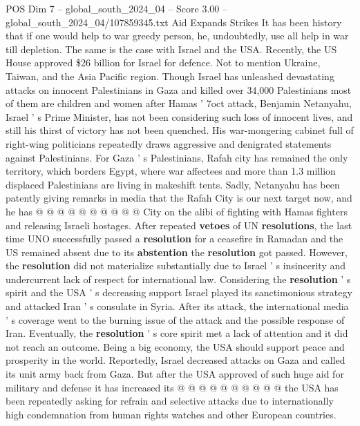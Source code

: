 \begin{textsample}{POS Dim 7 – global\_south\_2024\_04 – Score 3.00 – global\_south\_2024\_04/107859345.txt}  \label{ex:f7_pos_102}
Aid Expands Strikes It has been history that if one would help to war greedy person, he, undoubtedly, use all help in war till depletion.
The same is the case with Israel and the USA.
Recently, the US House approved \$26 billion for Israel for defence.
Not to mention Ukraine, Taiwan, and the Asia Pacific region.
Though Israel has unleashed devastating attacks on innocent Palestinians in Gaza and killed over 34,000 Palestinians most of them are children and women after Hamas ' 7oct attack, Benjamin Netanyahu, Israel ' s Prime Minister, has not been considering such loss of innocent lives, and still his thirst of victory has not been quenched.
His war-mongering cabinet full of right-wing politicians repeatedly draws aggressive and denigrated statements against Palestinians.
For Gaza ' s Palestinians, Rafah city has remained the only territory, which borders Egypt, where war affectees and more than 1.3 million displaced Palestinians are living in makeshift tents.
Sadly, Netanyahu has been patently giving remarks in media that the Rafah City is our next target now, and he has @ @ @ @ @ @ @ @ @ @ City on the alibi of fighting with Hamas fighters and releasing Israeli hostages.
After repeated \textbf{vetoes} of UN \textbf{resolutions}, the last time UNO successfully passed a \textbf{resolution} for a ceasefire in Ramadan and the US remained absent due to its \textbf{abstention} the \textbf{resolution} got passed.
However, the \textbf{resolution} did not materialize substantially due to Israel ' s insincerity and undercurrent lack of respect for international law.
Considering the \textbf{resolution} ' s spirit and the USA ' s decreasing support Israel played its sanctimonious strategy and attacked Iran ' s consulate in Syria.
After its attack, the international media ' s coverage went to the burning issue of the attack and the possible response of Iran.
Eventually, the \textbf{resolution} ' s core spirit met a lack of attention and it did not reach an outcome.
Being a big economy, the USA should support peace and prosperity in the world.
Reportedly, Israel decreased attacks on Gaza and called its unit army back from Gaza.
But after the USA approved of such huge aid for military and defense it has increased its @ @ @ @ @ @ @ @ @ @ the USA has been repeatedly asking for refrain and selective attacks due to internationally high condemnation from human rights watches and other European countries.

\end{textsample}
